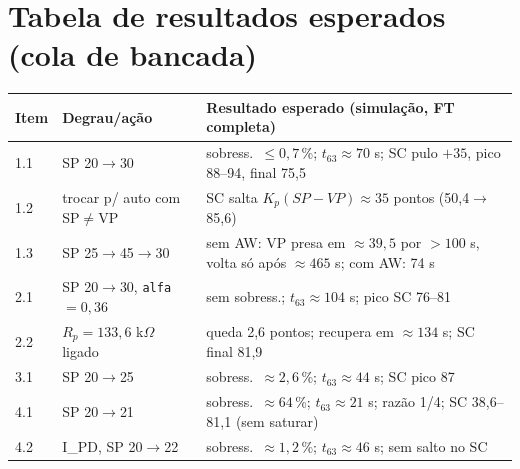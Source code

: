 \documentclass[11pt,a4paper]{article}
\begin{document}
\section{Tabela de resultados esperados (cola de bancada)}
\begin{center}\small
\begin{tabular}{llp{8cm}}\toprule Item & Degrau/ação & Resultado esperado (simulação, FT completa)\\\midrule
1.1 & SP 20$\to$30 & sobress.\ $\le0{,}7\,\%$; $t_{63}\approx70$ s; SC pulo $+35$, pico 88--94, final 75,5\\
1.2 & trocar p/ auto com SP$\ne$VP & SC salta $K_p(SP-VP)\approx35$ pontos (50,4$\to$85,6)\\
1.3 & SP 25$\to$45$\to$30 & sem AW: VP presa em $\approx39{,}5$ por $>100$ s, volta só após $\approx465$ s; com AW: 74 s\\
2.1 & SP 20$\to$30, \texttt{alfa}$=0{,}36$ & sem sobress.; $t_{63}\approx104$ s; pico SC 76--81\\
2.2 & $R_p=133{,}6$ k$\Omega$ ligado & queda 2,6 pontos; recupera em $\approx134$ s; SC final 81,9\\
3.1 & SP 20$\to$25 & sobress.\ $\approx2{,}6\,\%$; $t_{63}\approx44$ s; SC pico 87\\
4.1 & SP 20$\to$21 & sobress.\ $\approx64\,\%$; $t_{63}\approx21$ s; razão 1/4; SC 38,6--81,1 (sem saturar)\\
4.2 & I\_PD, SP 20$\to$22 & sobress.\ $\approx1{,}2\,\%$; $t_{63}\approx46$ s; sem salto no SC\\\bottomrule\end{tabular}\end{center}
\end{document}
